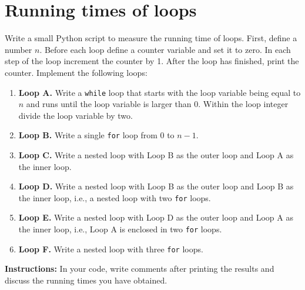 \documentclass[a4paper,10pt]{article}
\begin{document}
\section*{Running times of loops}

Write a small Python script to measure the running time of loops. First, define a number \( n \).  
Before each loop define a counter variable and set it to zero. In each step of the loop increment the counter by 1.  
After the loop has finished, print the counter. Implement the following loops:

\begin{enumerate}[label=\arabic*)]
    \item \textbf{Loop A.} Write a \texttt{while} loop that starts with the loop variable being equal to \( n \) and runs until the loop variable is larger than 0. Within the loop integer divide the loop variable by two.
    
    \item \textbf{Loop B.} Write a single \texttt{for} loop from 0 to \( n - 1 \).
    
    \item \textbf{Loop C.} Write a nested loop with Loop B as the outer loop and Loop A as the inner loop.
    
    \item \textbf{Loop D.} Write a nested loop with Loop B as the outer loop and Loop B as the inner loop, i.e., a nested loop with two \texttt{for} loops.
    
    \item \textbf{Loop E.} Write a nested loop with Loop D as the outer loop and Loop A as the inner loop, i.e., Loop A is enclosed in two \texttt{for} loops.
    
    \item \textbf{Loop F.} Write a nested loop with three \texttt{for} loops.
\end{enumerate}

\bigskip
\noindent
\textbf{Instructions:}  
In your code, write comments after printing the results and discuss the running times you have obtained.

\newpage
\mbox{} 

\newpage
\mbox{} 
\end{document}
